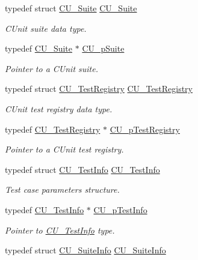 \begin{DoxyCompactItemize}
typedef struct \hyperlink{structCU__Suite}{C\-U\-\_\-\-Suite} \hyperlink{group__Framework_gad58d2b18d7da9c0ae48ae1679d1b8861}{C\-U\-\_\-\-Suite}
\begin{DoxyCompactList}\small\item\em C\-Unit suite data type. \end{DoxyCompactList}\item 
typedef \hyperlink{structCU__Suite}{C\-U\-\_\-\-Suite} $\ast$ \hyperlink{group__Framework_gaba832ae8b235f5e70d6a4ac9c3bb1219}{C\-U\-\_\-p\-Suite}
\begin{DoxyCompactList}\small\item\em Pointer to a C\-Unit suite. \end{DoxyCompactList}\item 
typedef struct \hyperlink{structCU__TestRegistry}{C\-U\-\_\-\-Test\-Registry} \hyperlink{group__Framework_ga9a7758811da313b88b23c6e6fdc537a0}{C\-U\-\_\-\-Test\-Registry}
\begin{DoxyCompactList}\small\item\em C\-Unit test registry data type. \end{DoxyCompactList}\item 
typedef \hyperlink{structCU__TestRegistry}{C\-U\-\_\-\-Test\-Registry} $\ast$ \hyperlink{group__Framework_ga2a416821761e04581a70c41ae3587d5c}{C\-U\-\_\-p\-Test\-Registry}
\begin{DoxyCompactList}\small\item\em Pointer to a C\-Unit test registry. \end{DoxyCompactList}\item 
typedef struct \hyperlink{structCU__TestInfo}{C\-U\-\_\-\-Test\-Info} \hyperlink{group__Framework_gad5892aef99bf82d4be23b9284531382d}{C\-U\-\_\-\-Test\-Info}
\begin{DoxyCompactList}\small\item\em Test case parameters structure. \end{DoxyCompactList}\item 
typedef \hyperlink{structCU__TestInfo}{C\-U\-\_\-\-Test\-Info} $\ast$ \hyperlink{group__Framework_ga146a57ac2abef6382399be83afb1daed}{C\-U\-\_\-p\-Test\-Info}
\begin{DoxyCompactList}\small\item\em Pointer to \hyperlink{structCU__TestInfo}{C\-U\-\_\-\-Test\-Info} type. \end{DoxyCompactList}\item 
typedef struct \hyperlink{structCU__SuiteInfo}{C\-U\-\_\-\-Suite\-Info} \hyperlink{group__Framework_ga345177d10f56a80873124d47cae930f0}{C\-U\-\_\-\-Suite\-Info}

\end{DoxyCompactItemize}

